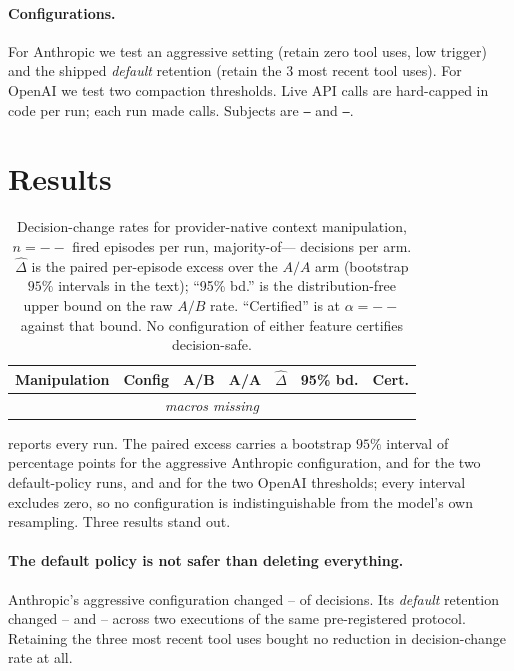 \documentclass[11pt]{article}
\newcommand{\pcAnthropicDefaultTwoAB}{--}\newcommand{\pcAnthropicDefaultTwoAA}{--}%
\newcommand{\pcAnthropicDefaultOneAB}{--}\newcommand{\pcAnthropicDefaultOneAA}{--}%
\newcommand{\pcAnthropicDefaultOneModel}{--}%
\newcommand{\pcAnthropicAggressiveAB}{--}\newcommand{\pcAnthropicAggressiveAA}{--}%
\newcommand{\pcOpenAIOneKModel}{--}%
\newcommand{\pcN}{--}\newcommand{\pcVotes}{--}\newcommand{\pcAlpha}{--}%
\newcommand{\pcTableBody}{\multicolumn{7}{c}{\textit{macros missing}} \\}}
\begin{document}
\paragraph{Configurations.}
For Anthropic we test an aggressive setting (retain zero tool uses, low trigger)
and the shipped \emph{default} retention (retain the 3 most recent tool uses). For
OpenAI we test two compaction thresholds. Live API calls are hard-capped in code
per run; each run made \pcAnthropicDefaultOneCalls{} calls. Subjects are
\texttt{\pcAnthropicDefaultOneModel} and \texttt{\pcOpenAIOneKModel}.

\section{Results}
\label{sec:results}

\begin{table}[t]
\centering
\footnotesize
\setlength{\tabcolsep}{3pt}
\begin{tabular}{llccccc}
\toprule
Manipulation & Config & A/B & A/A & $\widehat{\Delta}$ & 95\% bd. & Cert. \\
\midrule
\pcTableBody
\bottomrule
\end{tabular}
\caption{Decision-change rates for provider-native context manipulation,
$n=\pcN$ fired episodes per run, majority-of-\pcVotes{} decisions per arm.
$\widehat{\Delta}$ is the paired per-episode excess over the $A/A$ arm
(bootstrap $95\%$ intervals in the text); ``95\% bd.'' is the distribution-free
upper bound on the raw $A/B$ rate. ``Certified'' is at $\alpha=\pcAlpha$ against that bound.
No configuration of either feature certifies decision-safe.}
\label{tab:main}
\end{table}

 reports every run. The paired excess carries a bootstrap $95\%$
interval of \pcAnthropicAggressiveExcessCI{} percentage points for the aggressive
Anthropic configuration, \pcAnthropicDefaultOneExcessCI{} and
\pcAnthropicDefaultTwoExcessCI{} for the two default-policy runs, and
\pcOpenAIOneKExcessCI{} and \pcOpenAIThreeKExcessCI{} for the two OpenAI
thresholds; every interval excludes zero, so no configuration is
indistinguishable from the model's own resampling. Three results stand out.

\paragraph{The default policy is not safer than deleting everything.}
Anthropic's aggressive configuration changed \pcAnthropicAggressiveAB{} of
decisions. Its \emph{default} retention changed \pcAnthropicDefaultOneAB{} and
\pcAnthropicDefaultTwoAB{} across two executions of the same pre-registered
protocol. Retaining the three most recent tool uses bought no reduction in
decision-change rate at all.
\end{document}
